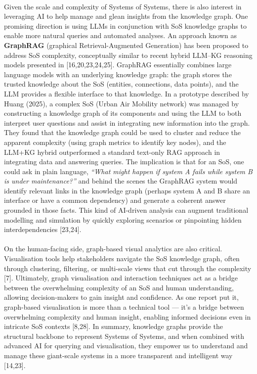         \paragraph{}
        Given the scale and complexity of Systems of Systems, there is also interest in leveraging AI to help manage and glean insights from the knowledge graph. One promising direction is using LLMs in conjunction with SoS knowledge graphs to enable more natural queries and automated analyses. An approach known as \textbf{GraphRAG} (graphical Retrieval-Augmented Generation) has been proposed to address SoS complexity, conceptually similar to recent hybrid LLM–KG reasoning models presented in [16,20,23,24,25]. GraphRAG essentially combines large language models with an underlying knowledge graph: the graph stores the trusted knowledge about the SoS (entities, connections, data points), and the LLM provides a flexible interface to that knowledge. In a prototype described by Huang (2025), a complex SoS (Urban Air Mobility network) was managed by constructing a knowledge graph of its components and using the LLM to both interpret user questions and assist in integrating new information into the graph. They found that the knowledge graph could be used to cluster and reduce the apparent complexity (using graph metrics to identify key nodes), and the LLM+KG hybrid outperformed a standard text-only RAG approach in integrating data and answering queries. The implication is that for an SoS, one could ask in plain language, \textit{“What might happen if system A fails while system B is under maintenance?”} and behind the scenes the GraphRAG system would identify relevant links in the knowledge graph (perhaps system A and B share an interface or have a common dependency) and generate a coherent answer grounded in those facts. This kind of AI-driven analysis can augment traditional modelling and simulation by quickly exploring scenarios or pinpointing hidden interdependencies [23,24].
        
        \newpage
        \paragraph{}
        On the human-facing side, graph-based visual analytics are also critical. Visualisation tools help stakeholders navigate the SoS knowledge graph, often through clustering, filtering, or multi-scale views that cut through the complexity [7]. Ultimately, graph visualisation and interaction techniques act as a bridge between the overwhelming complexity of an SoS and human understanding, allowing decision-makers to gain insight and confidence. As one report put it, graph-based visualisation is more than a technical tool — it’s a bridge between overwhelming complexity and human insight, enabling informed decisions even in intricate SoS contexts [8,28]. In summary, knowledge graphs provide the structural backbone to represent Systems of Systems, and when combined with advanced AI for querying and visualisation, they empower us to understand and manage these giant-scale systems in a more transparent and intelligent way [14,23].

